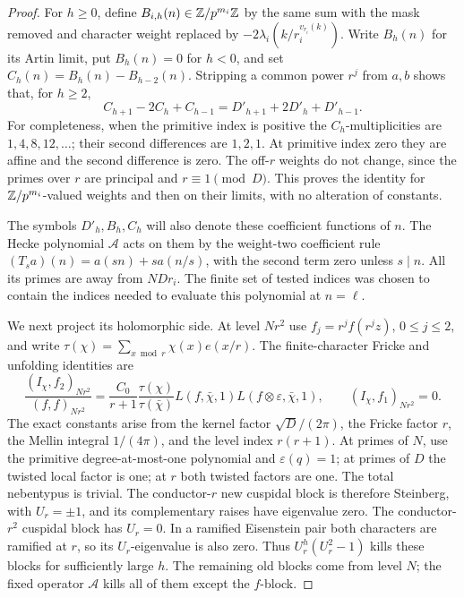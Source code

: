 \begin{proof}
For \(h\ge0\), define \(B_{i,h}(n)\in\mathbb Z/p^{m_i}\mathbb Z\) by
the same sum with the mask removed and character weight
replaced by \(-2\lambda_i(k/r_i^{v_{r_i}(k)})\).  Write
\(B_h(n)\) for its Artin limit, put \(B_h(n)=0\) for
\(h<0\), and set \(C_h(n)=B_h(n)-B_{h-2}(n)\).
Stripping a common power \(r^j\) from \(a,b\) shows that,
for \(h\ge2\),
\begin{equation}\label{single:mask}
 C_{h+1}-2C_h+C_{h-1}=D'_{h+1}+2D'_h+D'_{h-1}.
\end{equation}
For completeness, when the primitive index is positive the
\(C_h\)-multiplicities are \(1,4,8,12,\ldots\); their second
differences are \(1,2,1\).  At primitive index zero they are
affine and the second difference is zero.  The off-\(r\)
weights do not change, since the primes over \(r\) are principal
and \(r\equiv1\pmod D\).  This proves the identity for
\(\mathbb Z/p^{m_i}\)-valued weights and then on their limits, with
no alteration of constants.

The symbols \(D'_h,B_h,C_h\) will also denote these coefficient
functions of \(n\).  The Hecke polynomial \(\mathcal A\)
acts on them by the weight-two coefficient rule
\((T_s a)(n)=a(sn)+s a(n/s)\), with the second term zero
unless \(s\mid n\).  All its primes are away from \(NDr_i\).
The finite set of tested indices was chosen to contain the
indices needed to evaluate this polynomial at \(n=\ell\).

We next project its holomorphic side.  At level \(Nr^2\) use
\(f_j=r^jf(r^jz)\), \(0\le j\le2\), and write
\(\tau(\chi)=\sum_{x\bmod r}\chi(x)e(x/r)\).
The finite-character Fricke and unfolding identities are
\begin{equation}\label{single:old-pairings}
 \frac{(I_\chi,f_2)_{Nr^2}}{(f,f)_{Nr^2}}
     =\frac{C_0}{r+1}\frac{\tau(\chi)}{\tau(\bar\chi)}
                L(f,\bar\chi,1)L(f\otimes\varepsilon,\bar\chi,1),
 \qquad (I_\chi,f_1)_{Nr^2}=0.
\end{equation}
The exact constants arise from the kernel factor
\(\sqrt D/(2\pi)\), the Fricke factor \(r\), the Mellin integral
\(1/(4\pi)\), and the level index \(r(r+1)\).
At primes of \(N\), use the primitive degree-at-most-one
polynomial and \(\varepsilon(q)=1\); at primes of \(D\) the
twisted local factor is one; at \(r\) both twisted factors
are one.  The total nebentypus is trivial.  The conductor-\(r\)
new cuspidal block is therefore Steinberg, with \(U_r=\pm1\),
and its complementary raises have eigenvalue zero.  The
conductor-\(r^2\) cuspidal block has \(U_r=0\).  In a
ramified Eisenstein pair both characters are ramified at \(r\),
so its \(U_r\)-eigenvalue is also zero.
Thus \(U_r^h(U_r^2-1)\) kills these blocks for sufficiently
large \(h\).  The remaining old blocks come from level \(N\);
the fixed operator \(\mathcal A\) kills all of them except
the \(f\)-block.


\end{proof}
